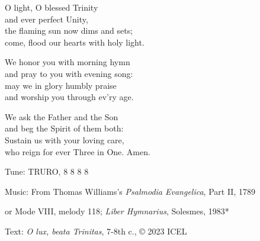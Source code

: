 \hymn

\begin{hymnverse}
O light, O blessed Trinity\\
and ever perfect Unity,\\
the flaming sun now dims and sets;\\
come, flood our hearts with holy light.

We honor you with morning hymn\\
and pray to you with evening song:\\
may we in glory humbly praise\\
and worship you through ev’ry age.

We ask the Father and the Son\\
and beg the Spirit of them both:\\
Sustain us with your loving care,\\
who reign for ever Three in One. Amen.
\end{hymnverse}

\begin{hymnsource}
Tune: TRURO, 8 8 8 8

Music: From Thomas Williams’s \emph{Psalmodia Evangelica}, Part II, 1789

or Mode VIII, melody 118; \emph{Liber Hymnarius}, Solesmes, 1983*

Text: \emph{O lux, beata Trinitas}, 7-8th c., © 2023 ICEL
\end{hymnsource}